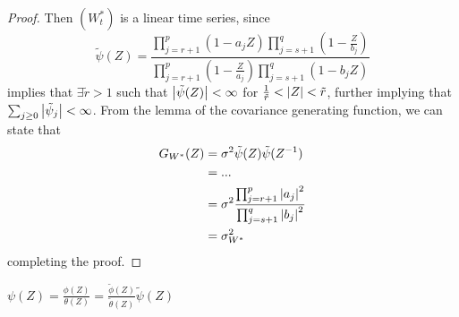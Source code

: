 \begin{proof}
    Then $(W_t^*)$ is a linear time series, since
    \[
        \tilde{\psi}(Z)=\frac{\prod_{j=r+1}^p(1-a_jZ)\prod_{j=s+1}^q\left(1-\frac{Z}{b_j}\right)}{\prod_{j=r+1}^p\left(1-\frac{Z}{a_j}\right)\prod_{j=s+1}^q(1-b_jZ)}
    \]
    implies that $\exists\tilde{r}>1$ such that $\left|\tilde{\psi}(Z)\right|<\infty$ for $\frac{1}{\tilde{r}}<\left|Z\right|<\tilde{r}$, further implying that $\sum_{j\ge0}\left|\tilde{\psi}_j\right|<\infty$. From the lemma of the covariance generating function, we can state that
    \begin{equation*}
        \begin{split}
            G_{W^*}(Z)&=\sigma^2\tilde{\psi}(Z)\tilde{\psi}(Z^{-1})\\
            &=...\\
            &=\sigma^2\frac{\prod_{j=r+1}^p\left|a_j\right|^2}{\prod_{j=s+1}^q\left|b_j\right|^2}\\
            &=\sigma_{W^*}^2\\
        \end{split}
    \end{equation*}
    completing the proof.
\end{proof}

\begin{remark}
    $\psi(Z)=\frac{\phi(Z)}{\theta(Z)}=\frac{\tilde{\phi}(Z)}{\tilde{\theta}(Z)}\tilde{\psi}(Z)$
\end{remark}